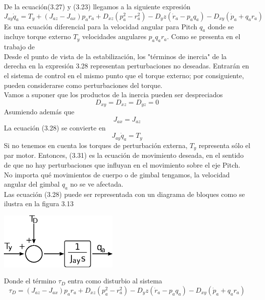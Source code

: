 De la ecuación(3.27) y (3.23) llegamos a la siguiente expresión
\begin{equation}
	J_{ay}\dot{q}_a = T_y + (J_{az} - J_{ax})p_ar_a + D_{xz}(p^2_a - r^2_a) - D_yz(\dot{r}_a - p_aq_a)-D_{xy}(\dot{p}_a + q_ar_a)
\end{equation}
Es una ecuación diferencial para la velocidad angular para Pitch $q_a$ donde se incluye
torque externo $T_y$ velocidades angulares $p_a q_a r_a$. Como se presenta en el trabajo de
\cite{Paper::Yoon2001} \\
Desde el punto de vista de la estabilización, los "términos de inercia" de la derecha en la expresión 3.28
representan perturbaciones no deseadas. Entrarán en el sistema de control en el mismo
punto que el torque externo; por consiguiente, pueden considerarse como perturbaciones del torque.
\\
Vamos a suponer que los productos de la inercia pueden ser despreciados
\begin{equation}
	D_{xy} = D_{xz} = D_{yz} = 0
\end{equation}
Asumiendo además que
\begin{equation}
	J_{ax} = J_{az}
\end{equation}
La ecuación (3.28) se convierte en
\begin{equation}
	J_{ay}\dot{q}_a = T_y
\end{equation}
Si no tenemos en cuenta los torques de perturbación externa, $T_y$ representa sólo el
par motor. Entonces, (3.31) es la ecuación de movimiento deseada, en el sentido de que
no hay perturbaciones que influyan en el movimiento sobre el eje Pitch. No importa qué
movimientos de cuerpo o de gimbal tengamos, la velocidad angular del gimbal $q_a$ no se
ve afectada.\\
Las ecuación (3.28) puede ser representada con un diagrama de bloques como se ilustra
en la figura 3.13
\begin{center}
	\includegraphics[width=0.44\textwidth]{Contenido/Cuerpo/Capitulo3/Fig21.eps}
	\label{fig:ModeloMat:Fig1}
\end{center}
Donde el término $\tau_D$ entra como disturbio al sistema
\begin{equation}
	\tau_D = (J_{az} - J_{ax})p_ar_a + D_{xz}(p^2_a - r^2_a) - D_yz(\dot{r}_a - p_aq_a)-D_{xy}(\dot{p}_a + q_ar_a)
\end{equation}

